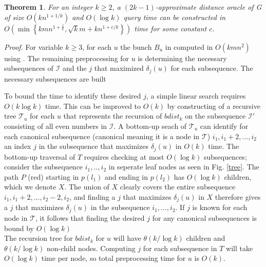 \documentclass[12pt]{article}
\newtheorem{thm}{Theorem}[section]
\begin{document}
\begin{thm}
For an integer $k\geq 2$, a $(2k - 1)$-approximate distance oracle of G of size $O(kn^{1+1/k})$ and $O(\log k)$ query time can be constructed in $O\left( \min \left\lbrace kmn^{1+\frac{1}{k}}, \sqrt{k}m + kn^{1+c/k}\right\rbrace\right)$ time for some constant $c$.
\end{thm}
{\it Proof.} For variable $k\geq 3$, for each $u$ the bunch $B_u$ in computed in $O(kmn^{2})$ using \cite{Thorup2005}. The remaining preprocessing for $u$ is determining the necessary subsequences of $\mathcal{I}$ and the $j$ that maximized $\delta_j(u)$ for each subsequence.
The necessary subsequences are built 

To bound the time to identify these desired $j$, a simple linear search requires $O(k\log k)$ time. This can be improved to $O(k)$ by constructing of a recursive tree $\mathcal{T}_u$ for each $u$ that represents the recursion of $bdist_k$ on the subsequence $\mathcal{I}'$ consisting of all even numbers in $\mathcal{I}$. A bottom-up seach of $\mathcal{T}_u$ can identify for each canonical subsequence (canonical meaning it is a node in $\mathcal{T}$) $i_1,i_1+2,...,i_2$ an index $j$ in the subsequence that maximizes $\delta_j(u)$ in $O(k)$ time. The bottom-up traversal of $T$ requires checking at most $O(\log k)$ subsequences; consider the subsequence $i_1,..,i_2$ in seperate leaf nodes as seen in Fig. \ref{tree}. The path $P$ (red) starting in $p(l_1)$ and ending in $p(l_2)$ has $O(\log k)$ children, which we denote $X$. The union of $X$ clearly covers the entire subsequence $i_1,i_1+2,...,i_2-2,i_2$, and finding a $j$ that maximizes $\delta_j(u)$ in $X$ therefore gives a $j$ that maximizes $\delta_j(u)$ in the subsequence $i_1,...,i_2$. If $j$ is known for each node in $\mathcal{T}$, it follows that finding the desired $j$ for any canonical subsequences is bound by $O(\log k)$\\

The recursion tree for $bdist_k$ for $u$ will have $\theta(k/\log k)$ children and $\theta(k/\log k)$ non-child nodes. Computing $j$ for each subsequence in $T$ will take $O(\log k)$ time per node, so total preprocessing time for $u$ is $O(k)$.  

 
\end{document}
